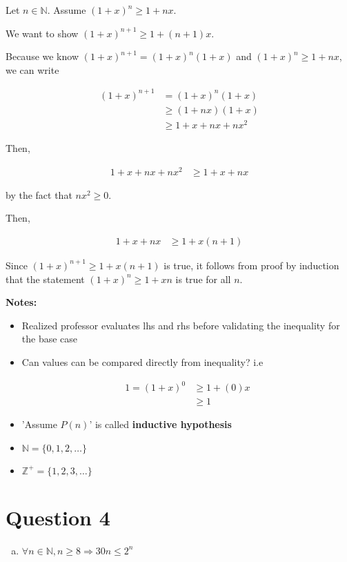 \documentclass[12pt]{article}
\begin{document}
\begin{enumerate}[a.]
\begin{mdframed}
        Let $n \in \mathbb{N}$. Assume $(1+x)^n \geq 1 + nx$.

        \bigskip

        We want to show $(1+x)^{n+1} \geq 1 + (n+1)x$.

        \bigskip

        Because we know $(1 + x)^{n+1} = (1+x)^n(1+x)$ and $(1+x)^n \geq 1 + nx$, we
        can write

        \begin{align}
            (1+x)^{n+1} &= (1+x)^n(1+x)\\
            &\geq (1+nx)(1+x)\\
            &\geq 1 + x + nx + nx^2
        \end{align}

        \bigskip

        Then,

        \begin{align}
            1 + x + nx + nx^2 &\geq 1 + x + nx
        \end{align}

        by the fact that $nx^2 \geq 0$.

        \bigskip

        Then,

        \begin{align}
            1 + x + nx &\geq 1 + x(n+1)
        \end{align}

        \bigskip

        Since $(1+x)^{n+1} \geq 1 + x(n+1)$ is true, it follows from proof by
        induction that the statement $(1+x)^n \geq 1 + xn$ is true for all $n$.

    \end{mdframed}

    \textbf{Notes:}
    \begin{itemize}
        \item Realized professor evaluates lhs and rhs before validating the inequality for the base case
        \item Can values can be compared directly from inequality? i.e

        \begin{align}
            1 = (1+x)^0 &\geq 1 + (0)x\\
            &\geq 1
        \end{align}

        \item 'Assume $P(n)$' is called \textbf{inductive hypothesis}
        \item $\mathbb{N} = \{0,1,2,\dots\}$
        \item $\mathbb{Z}^{+} = \{1,2,3,\dots\}$
    \end{itemize}

\end{enumerate}

\section*{Question 4}
\begin{enumerate}[a.]
    \item

    $\forall n \in \mathbb{N}, n \geq 8 \Rightarrow 30n \leq 2^n$
\end{enumerate}
\end{document}
